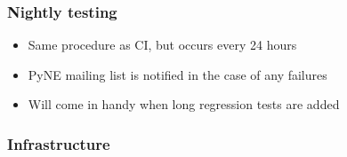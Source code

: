 \documentclass[12pt]{beamer}
\begin{document}
\begin{frame}
\frametitle{Nightly testing}

\begin{itemize}
\item{Same procedure as CI, but occurs every 24 hours}
\item{PyNE mailing list is notified in the case of any failures}
\item{Will come in handy when long regression tests are added}
\end{itemize}


\end{frame}

\begin{frame}
\frametitle{Infrastructure}


\end{frame}
\end{document}
